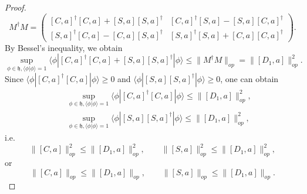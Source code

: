 \documentclass[10pt,a4paper]{amsart}
\begin{document}
\begin{proof}
\begin{equation}
    M^{\dag} M = \left( \begin{array}{cc}
      {}[C, a]^{\dag} [C, a] + [S, a] [S, a]^{\dag} & [C, a]^{\dag} [S, a] -
      [S, a] [C, a]^{\dag}\\
      {}[S, a]^{\dag} [C, a] - [C, a] [S, a]^{\dag} & [S, a]^{\dag} [S, a] +
      [C, a] [C, a]^{\dag}
    \end{array} \right) .
  \end{equation}
  By Bessel's inequality, we obtain
  \begin{equation}
    \sup_{\phi \in \mathfrak{h}, \langle \phi | \phi \rangle = 1}
    \!\!\!\!\! \langle \phi | [C, a]^{\dag} [C, a] +
    [S, a] [S, a]^{\dag} | \phi \rangle \leqslant \|M^{\dag} M\|_{op} =
     \|[D_1, a]\|_{op}^2 .
  \end{equation}
  Since $\langle \phi | [C, a]^{\dag} [C, a] | \phi \rangle \geqslant 0$ and
  $\langle \phi | [S, a] [S, a]^{\dag} | \phi \rangle \geqslant 0$, one can
  obtain
  \begin{eqnarray}
   && \sup_{\phi \in \mathfrak{h}, \langle \phi | \phi \rangle = 1}
    \!\!\!\!\! \langle \phi | [C, a]^{\dag} [C, a] |
    \phi \rangle \leqslant \|[D_1, a]\|_{op}^2,
\nonumber\\
   && \sup_{\phi \in \mathfrak{h}, \langle \phi | \phi \rangle = 1}
    \!\!\!\!\! \langle \phi | [S, a] [S, a]^{\dag} |
    \phi \rangle \leqslant \|[D_1, a]\|_{op}^2,
  \end{eqnarray}
  i.e.
  \begin{equation}
    \|[C, a]\|_{op}^2 \leqslant \|[D_1, a]\|_{op}^2, \qquad \|[S,
    a]\|_{op}^2 \leqslant \|[D_1, a]\|_{op}^2,
  \end{equation}
  or
  \begin{equation}
    \|[C, a]\|_{op} \leqslant \|[D_1, a]\|_{op}, \qquad
    \|[S, a]\|_{op} \leqslant \|[D_1, a]\|_{op} .
  \end{equation}
\end{proof}
\end{document}
